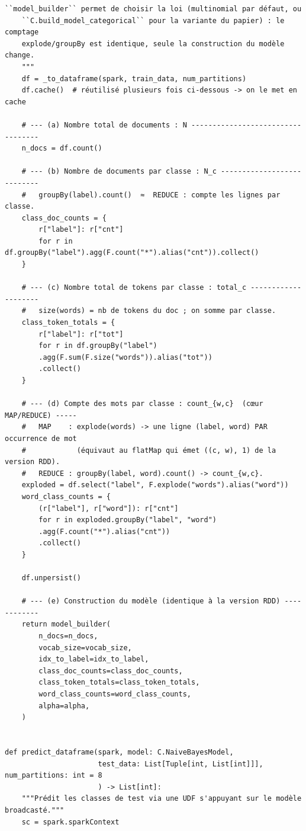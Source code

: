\begin{lstlisting}[style=py]
    ``model_builder`` permet de choisir la loi (multinomial par défaut, ou
    ``C.build_model_categorical`` pour la variante du papier) : le comptage
    explode/groupBy est identique, seule la construction du modèle change.
    """
    df = _to_dataframe(spark, train_data, num_partitions)
    df.cache()  # réutilisé plusieurs fois ci-dessous -> on le met en cache

    # --- (a) Nombre total de documents : N ----------------------------------
    n_docs = df.count()

    # --- (b) Nombre de documents par classe : N_c ---------------------------
    #   groupBy(label).count()  ≈  REDUCE : compte les lignes par classe.
    class_doc_counts = {
        r["label"]: r["cnt"]
        for r in df.groupBy("label").agg(F.count("*").alias("cnt")).collect()
    }

    # --- (c) Nombre total de tokens par classe : total_c --------------------
    #   size(words) = nb de tokens du doc ; on somme par classe.
    class_token_totals = {
        r["label"]: r["tot"]
        for r in df.groupBy("label")
        .agg(F.sum(F.size("words")).alias("tot"))
        .collect()
    }

    # --- (d) Compte des mots par classe : count_{w,c}  (cœur MAP/REDUCE) -----
    #   MAP    : explode(words) -> une ligne (label, word) PAR occurrence de mot
    #            (équivaut au flatMap qui émet ((c, w), 1) de la version RDD).
    #   REDUCE : groupBy(label, word).count() -> count_{w,c}.
    exploded = df.select("label", F.explode("words").alias("word"))
    word_class_counts = {
        (r["label"], r["word"]): r["cnt"]
        for r in exploded.groupBy("label", "word")
        .agg(F.count("*").alias("cnt"))
        .collect()
    }

    df.unpersist()

    # --- (e) Construction du modèle (identique à la version RDD) ------------
    return model_builder(
        n_docs=n_docs,
        vocab_size=vocab_size,
        idx_to_label=idx_to_label,
        class_doc_counts=class_doc_counts,
        class_token_totals=class_token_totals,
        word_class_counts=word_class_counts,
        alpha=alpha,
    )


def predict_dataframe(spark, model: C.NaiveBayesModel,
                      test_data: List[Tuple[int, List[int]]], num_partitions: int = 8
                      ) -> List[int]:
    """Prédit les classes de test via une UDF s'appuyant sur le modèle broadcasté."""
    sc = spark.sparkContext


\end{lstlisting}
